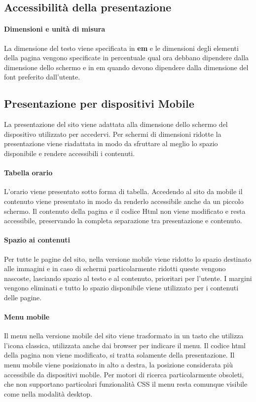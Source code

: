 \documentclass[12pt,a4paper]{article}
\begin{document}
\subsection{Accessibilità della presentazione}
\paragraph{Dimensioni e unità di misura} La dimensione del testo viene specificata in \textbf{em} e le dimensioni degli elementi della pagina vengono specificate in percentuale qual ora debbano dipendere dalla dimensione dello schermo e in em quando devono dipendere dalla dimensione del font preferito dall'utente. 

\subsection{Presentazione per dispositivi Mobile}
La presentazione del sito viene adattata alla dimensione dello schermo del dispositivo utilizzato per accedervi. 
Per schermi di dimensioni ridotte la presentazione viene riadattata in modo da sfruttare al meglio lo spazio disponibile e rendere accessibili i contenuti. 
\paragraph{Tabella orario}
L'orario viene presentato sotto forma di tabella. Accedendo al sito da mobile il contenuto viene presentato in modo da renderlo accessibile anche da un piccolo schermo. 
Il contenuto della pagina e il codice Html non viene modificato e resta accessibile, preservando la completa separazione tra presentazione e contenuto. 

\paragraph{Spazio ai contenuti} Per tutte le pagine del sito, nella versione mobile viene ridotto lo spazio destinato alle immagini e in caso di schermi particolarmente ridotti queste vengono nascoste, lasciando spazio al testo e al contenuto, prioritari per l'utente. 
I margini vengono eliminati e tutto lo spazio disponibile viene utilizzato per i contenuti delle pagine.

\paragraph{Menu mobile} Il menu nella versione mobile del sito viene trasformato in un tasto che utilizza l'icona classica, utilizzata anche dai browser per indicare il menu. 
Il codice html della pagina non viene modificato, si tratta solamente della presentazione. 
Il menu mobile viene posizionato in alto a destra, la posizione considerata più accessibile da dispositivi mobile. 
Per motori di ricerca particolarmente obsoleti, che non supportano particolari funzionalità CSS il menu resta comunque visibile come nella modalità desktop.
\end{document}
